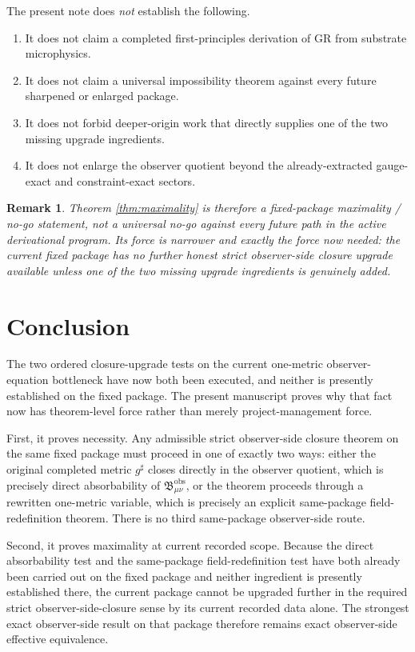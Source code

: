 \documentclass[11pt]{article}
\newcommand{\CompletedMetric}{g^{\sharp}}
\newcommand{\ObsBurden}{\mathfrak B_{\mu\nu}^{\mathrm{obs}}}
\newtheorem{remark}{Remark}
\begin{document}
The present note does \emph{not} establish the following.
\begin{enumerate}
    \item It does not claim a completed first-principles derivation of GR from substrate microphysics.
    \item It does not claim a universal impossibility theorem against every future sharpened or enlarged package.
    \item It does not forbid deeper-origin work that directly supplies one of the two missing upgrade ingredients.
    \item It does not enlarge the observer quotient beyond the already-extracted gauge-exact and constraint-exact sectors.
\end{enumerate}

\begin{remark}
Theorem \ref{thm:maximality} is therefore a fixed-package maximality / no-go statement, not a universal no-go against every future path in the active derivational program. Its force is narrower and exactly the force now needed: the current fixed package has no further honest strict observer-side closure upgrade available unless one of the two missing upgrade ingredients is genuinely added.
\end{remark}

\section{Conclusion}

The two ordered closure-upgrade tests on the current one-metric observer-equation bottleneck have now both been executed, and neither is presently established on the fixed package. The present manuscript proves why that fact now has theorem-level force rather than merely project-management force.

First, it proves necessity. Any admissible strict observer-side closure theorem on the same fixed package must proceed in one of exactly two ways: either the original completed metric \(\CompletedMetric\) closes directly in the observer quotient, which is precisely direct absorbability of \(\ObsBurden\), or the theorem proceeds through a rewritten one-metric variable, which is precisely an explicit same-package field-redefinition theorem. There is no third same-package observer-side route.

Second, it proves maximality at current recorded scope. Because the direct absorbability test and the same-package field-redefinition test have both already been carried out on the fixed package and neither ingredient is presently established there, the current package cannot be upgraded further in the required strict observer-side-closure sense by its current recorded data alone. The strongest exact observer-side result on that package therefore remains exact observer-side effective equivalence.
\end{document}
